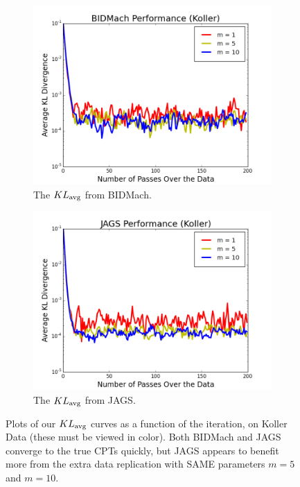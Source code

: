 \documentclass{article} %
\begin{document}
\begin{figure}[t]
\centering
\begin{subfigure}{.5\textwidth}
  \centering
  \includegraphics[width=0.9\linewidth]{fig_kldiv_koller_mb4_gpu}
  \caption{The $KL_{\rm avg}$ from BIDMach.}
  \label{fig:kl_bidmach}
\end{subfigure}%
\begin{subfigure}{.5\textwidth}
  \centering
  \includegraphics[width=0.9\linewidth]{fig_kldiv_50perc_jags}
  \caption{The $KL_{\rm avg}$ from JAGS.}
  \label{fig:kl_jags}
\end{subfigure}
\caption{Plots of our $KL_{\rm avg}$ curves as a function of the iteration, on Koller Data (these
must be viewed in color). Both BIDMach and JAGS converge to the true CPTs quickly, but JAGS appears
to benefit more from the extra data replication with SAME parameters $m=5$ and $m=10$.}
\label{fig:first_set}
\end{figure}
\end{document}
